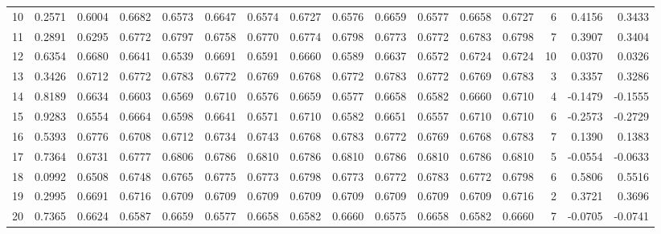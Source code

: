 \begin{tabular}{lrrrrrrrrrrrrrrr}
10  &      0.2571 &  0.6004 &  0.6682 &  0.6573 &  0.6647 &  0.6574 &  0.6727 &  0.6576 &  0.6659 &  0.6577 &   0.6658 &     0.6727 &      6 &                    0.4156 &                     0.3433 \\
11  &      0.2891 &  0.6295 &  0.6772 &  0.6797 &  0.6758 &  0.6770 &  0.6774 &  0.6798 &  0.6773 &  0.6772 &   0.6783 &     0.6798 &      7 &                    0.3907 &                     0.3404 \\
12  &      0.6354 &  0.6680 &  0.6641 &  0.6539 &  0.6691 &  0.6591 &  0.6660 &  0.6589 &  0.6637 &  0.6572 &   0.6724 &     0.6724 &     10 &                    0.0370 &                     0.0326 \\
13  &      0.3426 &  0.6712 &  0.6772 &  0.6783 &  0.6772 &  0.6769 &  0.6768 &  0.6772 &  0.6783 &  0.6772 &   0.6769 &     0.6783 &      3 &                    0.3357 &                     0.3286 \\
14  &      0.8189 &  0.6634 &  0.6603 &  0.6569 &  0.6710 &  0.6576 &  0.6659 &  0.6577 &  0.6658 &  0.6582 &   0.6660 &     0.6710 &      4 &                   -0.1479 &                    -0.1555 \\
15  &      0.9283 &  0.6554 &  0.6664 &  0.6598 &  0.6641 &  0.6571 &  0.6710 &  0.6582 &  0.6651 &  0.6557 &   0.6710 &     0.6710 &      6 &                   -0.2573 &                    -0.2729 \\
16  &      0.5393 &  0.6776 &  0.6708 &  0.6712 &  0.6734 &  0.6743 &  0.6768 &  0.6783 &  0.6772 &  0.6769 &   0.6768 &     0.6783 &      7 &                    0.1390 &                     0.1383 \\
17  &      0.7364 &  0.6731 &  0.6777 &  0.6806 &  0.6786 &  0.6810 &  0.6786 &  0.6810 &  0.6786 &  0.6810 &   0.6786 &     0.6810 &      5 &                   -0.0554 &                    -0.0633 \\
18  &      0.0992 &  0.6508 &  0.6748 &  0.6765 &  0.6775 &  0.6773 &  0.6798 &  0.6773 &  0.6772 &  0.6783 &   0.6772 &     0.6798 &      6 &                    0.5806 &                     0.5516 \\
19  &      0.2995 &  0.6691 &  0.6716 &  0.6709 &  0.6709 &  0.6709 &  0.6709 &  0.6709 &  0.6709 &  0.6709 &   0.6709 &     0.6716 &      2 &                    0.3721 &                     0.3696 \\
20  &      0.7365 &  0.6624 &  0.6587 &  0.6659 &  0.6577 &  0.6658 &  0.6582 &  0.6660 &  0.6575 &  0.6658 &   0.6582 &     0.6660 &      7 &                   -0.0705 &                    -0.0741 \\

\end{tabular}
